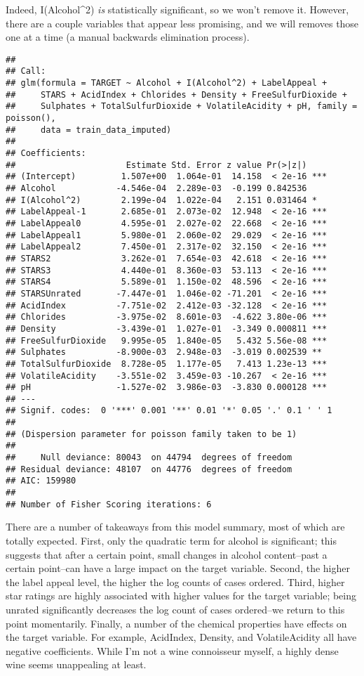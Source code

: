 \documentclass[
]{article}
\begin{document}
Indeed, I(Alcohol\^{}2) \emph{is} statistically significant, so we won't
remove it. However, there are a couple variables that appear less
promising, and we will removes those one at a time (a manual backwards
elimination process).

\begin{verbatim}
## 
## Call:
## glm(formula = TARGET ~ Alcohol + I(Alcohol^2) + LabelAppeal + 
##     STARS + AcidIndex + Chlorides + Density + FreeSulfurDioxide + 
##     Sulphates + TotalSulfurDioxide + VolatileAcidity + pH, family = poisson(), 
##     data = train_data_imputed)
## 
## Coefficients:
##                      Estimate Std. Error z value Pr(>|z|)    
## (Intercept)         1.507e+00  1.064e-01  14.158  < 2e-16 ***
## Alcohol            -4.546e-04  2.289e-03  -0.199 0.842536    
## I(Alcohol^2)        2.199e-04  1.022e-04   2.151 0.031464 *  
## LabelAppeal-1       2.685e-01  2.073e-02  12.948  < 2e-16 ***
## LabelAppeal0        4.595e-01  2.027e-02  22.668  < 2e-16 ***
## LabelAppeal1        5.980e-01  2.060e-02  29.029  < 2e-16 ***
## LabelAppeal2        7.450e-01  2.317e-02  32.150  < 2e-16 ***
## STARS2              3.262e-01  7.654e-03  42.618  < 2e-16 ***
## STARS3              4.440e-01  8.360e-03  53.113  < 2e-16 ***
## STARS4              5.589e-01  1.150e-02  48.596  < 2e-16 ***
## STARSUnrated       -7.447e-01  1.046e-02 -71.201  < 2e-16 ***
## AcidIndex          -7.751e-02  2.412e-03 -32.128  < 2e-16 ***
## Chlorides          -3.975e-02  8.601e-03  -4.622 3.80e-06 ***
## Density            -3.439e-01  1.027e-01  -3.349 0.000811 ***
## FreeSulfurDioxide   9.995e-05  1.840e-05   5.432 5.56e-08 ***
## Sulphates          -8.900e-03  2.948e-03  -3.019 0.002539 ** 
## TotalSulfurDioxide  8.728e-05  1.177e-05   7.413 1.23e-13 ***
## VolatileAcidity    -3.551e-02  3.459e-03 -10.267  < 2e-16 ***
## pH                 -1.527e-02  3.986e-03  -3.830 0.000128 ***
## ---
## Signif. codes:  0 '***' 0.001 '**' 0.01 '*' 0.05 '.' 0.1 ' ' 1
## 
## (Dispersion parameter for poisson family taken to be 1)
## 
##     Null deviance: 80043  on 44794  degrees of freedom
## Residual deviance: 48107  on 44776  degrees of freedom
## AIC: 159980
## 
## Number of Fisher Scoring iterations: 6
\end{verbatim}

There are a number of takeaways from this model summary, most of which
are totally expected. First, only the quadratic term for alcohol is
significant; this suggests that after a certain point, small changes in
alcohol content--past a certain point--can have a large impact on the
target variable. Second, the higher the label appeal level, the higher
the log counts of cases ordered. Third, higher star ratings are highly
associated with higher values for the target variable; being unrated
significantly decreases the log count of cases ordered--we return to
this point momentarily. Finally, a number of the chemical properties
have effects on the target variable. For example, AcidIndex, Density,
and VolatileAcidity all have negative coefficients. While I'm not a wine
connoisseur myself, a highly dense wine seems unappealing at least.
\end{document}
